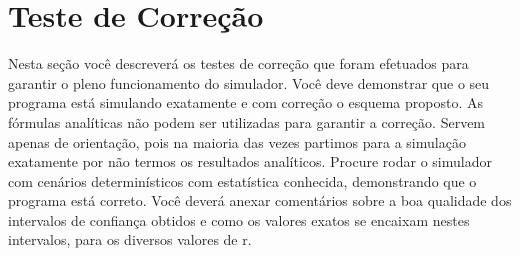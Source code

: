 \chapter{Teste de Correção}

Nesta seção você descreverá os testes de correção que foram efetuados para garantir o
pleno funcionamento do simulador. Você deve demonstrar que o seu programa está
simulando exatamente e com correção o esquema proposto. As fórmulas analíticas não
podem ser utilizadas para garantir a correção. Servem apenas de orientação, pois na maioria
das vezes partimos para a simulação exatamente por não termos os resultados analíticos.
Procure rodar o simulador com cenários determinísticos com estatística conhecida,
demonstrando que o programa está correto.
Você deverá anexar comentários sobre a boa qualidade dos intervalos de confiança obtidos
e como os valores exatos se encaixam nestes intervalos, para os diversos valores de r.
